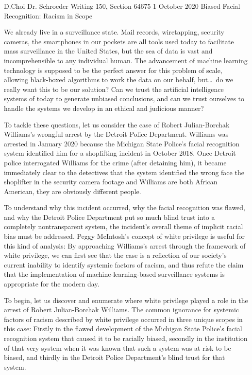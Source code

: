 \documentclass[12pt, letterpaper]{article}
\begin{document}
\begin{mla}
	{D.}{Choi}
	{Dr. Schroeder}
	{Writing 150, Section 64675}
	{1 October 2020}
	{Biased Facial Recognition: Racism in Scope}


We already live in a surveillance state. Mail records, wiretapping, security
cameras, the smartphones in our pockets are all tools used
today to facilitate mass surveillance in the United States, but the sea of
data is vast and incomprehensible to any individual human. The advancement of
machine learning technology is supposed to be the perfect answer for this
problem of scale, allowing black-boxed algorithms to work the data on our
behalf, but\ldots\ do we really want this to be our solution? Can we trust
the artificial intelligence systems of today to generate unbiased conclusions,
and can we trust ourselves to handle the systems we develop in an ethical
and judicious manner?

To tackle these questions, let us consider the case of
Robert Julian-Borchak Williams's wrongful arrest by the Detroit Police
Department. Williams was arrested in January 2020 because the Michigan State
Police's facial recognition system identified him for a shoplifting incident
in October 2018. Once Detroit police interrogated Williams for the crime
(after detaining him), it became immediately clear to the detectives that the
system identified the wrong face the shoplifter in the
security camera footage and Williams are both African American, they are
obviously different people.

To understand why this incident occurred, why the facial recognition was
flawed, and why the Detroit Police Department put so much blind trust into a
completely nontransparent system, the incident's overall theme of implicit
racial bias must be addressed. Peggy McIntosh's concept of white privilege is
useful for this kind of analysis: By approaching Williams's arrest through the
framework of white privilege, we can first see that the case is a reflection
of our society's current inability to identify systemic factors of racism, and
thus refute the claim that the implementation of machine-learning-based
surveillance systems is appropriate for the modern day.

To begin, let us discover and enumerate where white privilege played a role in
the arrest of Robert Julian-Borchak Williams. The common ignorance for
systemic factors of racism described by white privilege occurred in three
unique scopes in this case: Firstly in the flawed development of the Michigan
State Police's facial recognition system that caused it to be racially biased,
secondly in the institution of that very system when it was known that such a
system was at risk to be biased, and thirdly in the Detroit Police
Department's blind trust for that system.


\end{mla}
\end{document}
